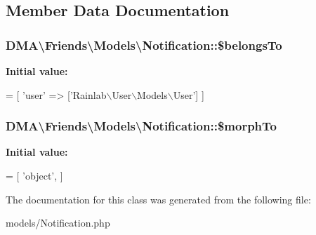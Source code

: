 

\subsection{Member Data Documentation}
\hypertarget{classDMA_1_1Friends_1_1Models_1_1Notification_a7bd3ea8c8431f36da353372d8e42ae44}{
\subsubsection[{\$belongs\-To}]{\setlength{\rightskip}{0pt plus 5cm}D\-M\-A\textbackslash{}\-Friends\textbackslash{}\-Models\textbackslash{}\-Notification\-::\$belongs\-To}}\label{classDMA_1_1Friends_1_1Models_1_1Notification_a7bd3ea8c8431f36da353372d8e42ae44}
{\bfseries Initial value\-:}
\begin{DoxyCode}
= [
        \textcolor{stringliteral}{'user'} => [\textcolor{stringliteral}{'Rainlab\(\backslash\)User\(\backslash\)Models\(\backslash\)User'}]    
    ]
\end{DoxyCode}
\hypertarget{classDMA_1_1Friends_1_1Models_1_1Notification_ac726a50fd0378357be2f744f4c0bfb66}{
\subsubsection[{\$morph\-To}]{\setlength{\rightskip}{0pt plus 5cm}D\-M\-A\textbackslash{}\-Friends\textbackslash{}\-Models\textbackslash{}\-Notification\-::\$morph\-To}}\label{classDMA_1_1Friends_1_1Models_1_1Notification_ac726a50fd0378357be2f744f4c0bfb66}
{\bfseries Initial value\-:}
\begin{DoxyCode}
= [
        \textcolor{stringliteral}{'object'},
    ]
\end{DoxyCode}


The documentation for this class was generated from the following file\-:\begin{DoxyCompactItemize}
\item 
models/Notification.\-php\end{DoxyCompactItemize}
